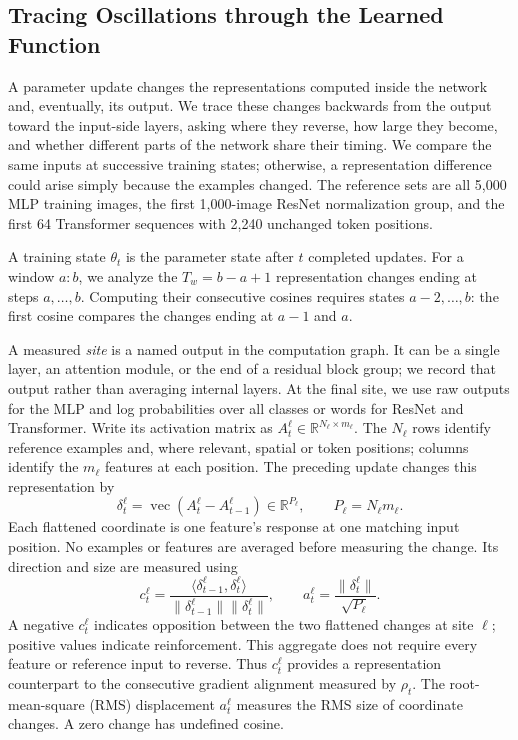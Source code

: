 \subsection{Tracing Oscillations through the Learned Function}
\label{subsec:tracing}

A parameter update changes the representations computed inside the
network and, eventually, its output. We trace these changes backwards
from the output toward the input-side layers, asking where they reverse,
how large they become, and whether different parts of the network share
their timing. We compare the same inputs at successive training states;
otherwise, a representation difference could arise simply because the
examples changed. The reference sets are all 5,000 MLP training images,
the first 1,000-image ResNet normalization group, and the first 64 Transformer
sequences with 2,240 unchanged token positions.

A training state $\theta_t$ is the parameter state after $t$ completed
updates. For a window $a{:}b$, we analyze the $T_w=b-a+1$ representation
changes ending at steps $a,\ldots,b$. Computing their consecutive
cosines requires states $a-2,\ldots,b$: the first cosine compares the
changes ending at $a-1$ and $a$.

A measured \emph{site} is a named output in the computation graph.
It can be a single layer, an attention module, or the end of a residual
block group; we record that output rather than averaging internal layers.
At the final site, we use raw outputs for the MLP and log probabilities
over all classes or words for ResNet and Transformer.
Write its activation matrix as $A_t^\ell\in\mathbb R^{N_\ell\times m_\ell}$.
The $N_\ell$ rows identify reference examples and, where relevant, spatial
or token positions; columns identify the $m_\ell$ features at each position.
The preceding update changes this representation by
\begin{equation}
 \delta_t^\ell=\operatorname{vec}(A_t^\ell-A_{t-1}^\ell)
 \in\mathbb R^{P_\ell},\qquad P_\ell=N_\ell m_\ell.
 \label{eq:representation-change}
\end{equation}
Each flattened coordinate is one feature's response at one matching
input position. No examples or features are averaged before measuring
the change. Its direction and size are measured using
\begin{equation}
 c_t^\ell=
 \frac{\langle\delta_{t-1}^\ell,\delta_t^\ell\rangle}
 {\|\delta_{t-1}^\ell\|\|\delta_t^\ell\|},\qquad
 a_t^\ell=\frac{\|\delta_t^\ell\|}{\sqrt{P_\ell}}.
 \label{eq:representation-motion}
\end{equation}
A negative $c_t^\ell$ indicates opposition between the two flattened
changes at site $\ell$; positive values indicate reinforcement. This
aggregate does not require every feature or reference input to reverse.
Thus $c_t^\ell$ provides a representation counterpart to the consecutive
gradient alignment measured by $\rho_t$. The root-mean-square (RMS)
displacement $a_t^\ell$ measures the RMS size of coordinate changes.
A zero change has undefined cosine.

